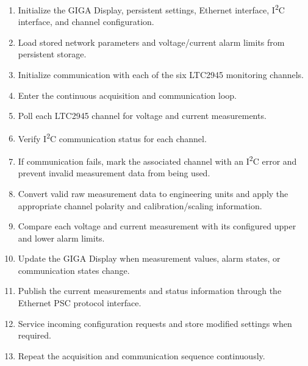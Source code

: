 \begin{enumerate}
    \item Initialize the GIGA Display, persistent settings, Ethernet interface,
    I\textsuperscript{2}C interface, and channel configuration.

    \item Load stored network parameters and voltage/current alarm limits from
    persistent storage.

    \item Initialize communication with each of the six LTC2945 monitoring
    channels.

    \item Enter the continuous acquisition and communication loop.

    \item Poll each LTC2945 channel for voltage and current measurements.

    \item Verify I\textsuperscript{2}C communication status for each channel.

    \item If communication fails, mark the associated channel with an
    I\textsuperscript{2}C error and prevent invalid measurement data from being
    used.

    \item Convert valid raw measurement data to engineering units and apply the
    appropriate channel polarity and calibration/scaling information.

    \item Compare each voltage and current measurement with its configured
    upper and lower alarm limits.

    \item Update the GIGA Display when measurement values, alarm states, or
    communication states change.

    \item Publish the current measurements and status information through the
    Ethernet PSC protocol interface.

    \item Service incoming configuration requests and store modified settings
    when required.

    \item Repeat the acquisition and communication sequence continuously.
\end{enumerate}


